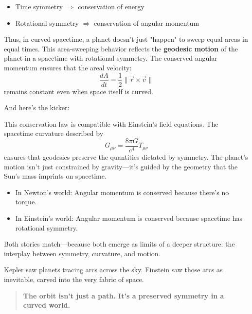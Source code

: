 \begin{itemize}
  \item Time symmetry \( \Rightarrow \) conservation of energy
  \item Rotational symmetry \( \Rightarrow \) conservation of angular momentum
\end{itemize}

Thus, in curved spacetime, a planet doesn’t just "happen" to sweep equal areas in equal times. This area-sweeping behavior reflects the \textbf{geodesic motion} of the planet in a spacetime with rotational symmetry. The conserved angular momentum ensures that the areal velocity:
\[
\frac{dA}{dt} = \frac{1}{2} \| \vec{r} \times \vec{v} \|
\]
remains constant even when space itself is curved.

And here’s the kicker:

This conservation law is compatible with Einstein’s field equations. The spacetime curvature described by 
\[
G_{\mu\nu} = \frac{8\pi G}{c^4} T_{\mu\nu}
\]
ensures that geodesics preserve the quantities dictated by symmetry. The planet’s motion isn’t just constrained by gravity—it’s guided by the geometry that the Sun’s mass imprints on spacetime.

\begin{tcolorbox}[colback=blue!5!white, colframe=blue!50!black, title={Kepler’s Law in Einstein’s Universe}]
\begin{itemize}
  \item In Newton’s world: Angular momentum is conserved because there’s no torque.
  \item In Einstein’s world: Angular momentum is conserved because spacetime has rotational symmetry.
\end{itemize}

Both stories match—because both emerge as limits of a deeper structure: the interplay between symmetry, curvature, and motion.
\end{tcolorbox}

Kepler saw planets tracing arcs across the sky.  
Einstein saw those arcs as inevitable, carved into the very fabric of space.

\begin{quote}
\textbf{The orbit isn’t just a path. It’s a preserved symmetry in a curved world.}
\end{quote}
